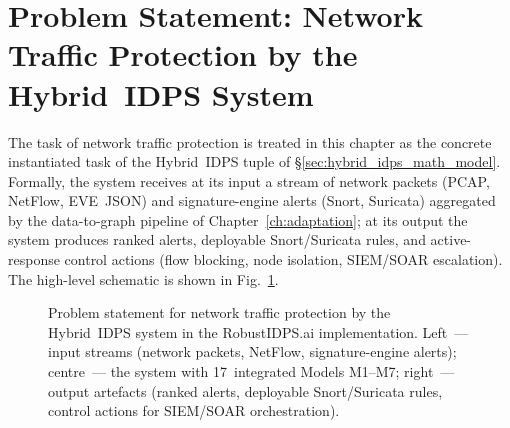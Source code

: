 \section{Problem Statement: Network Traffic Protection by the Hybrid~IDPS System}
\label{sec:platform_problem_statement}

The task of network traffic protection is treated in this chapter as
the concrete instantiated task of the Hybrid~IDPS tuple of
\S\ref{sec:hybrid_idps_math_model}. Formally, the system receives at
its input a stream of network packets (PCAP, NetFlow, EVE~JSON) and
signature-engine alerts (Snort, Suricata) aggregated by the
data-to-graph pipeline of Chapter~\ref{ch:adaptation}; at its
output the system produces ranked alerts, deployable Snort/Suricata
rules, and active-response control actions (flow blocking, node
isolation, SIEM/SOAR escalation). The high-level schematic is
shown in Fig.~\ref{fig:platform_problem_box}.

\begin{figure}[htbp]
\centering
{}
\caption{Problem statement for network traffic protection by the
Hybrid~IDPS system in the \textsf{RobustIDPS.ai} implementation.
Left~--- input streams (network packets, NetFlow, signature-engine
alerts); centre~--- the system with 17~integrated Models M1--M7;
right~--- output artefacts (ranked alerts, deployable
Snort/Suricata rules, control actions for SIEM/SOAR orchestration).}
\label{fig:platform_problem_box}
\end{figure}

